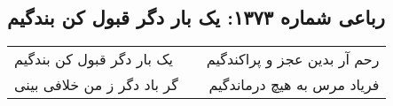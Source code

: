 \begin{center}
\section*{رباعی شماره ۱۳۷۳: یک بار دگر قبول کن بندگیم}
\label{sec:1373}
\begin{longtable}{l p{0.5cm} r}
یک بار دگر قبول کن بندگیم
&&
رحم آر بدین عجز و پراکندگیم
\\
گر باد دگر ز من خلافی بینی
&&
فریاد مرس به هیچ درماندگیم
\\
\end{longtable}
\end{center}

